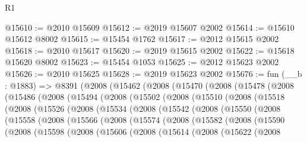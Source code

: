 \begin{lexlean}{R1}
\begin{coremodule}
@15610 := @2010 @15609
@15612 := @2019 @15607 @2002
@15614 := @15610 @15612 @8002
@15615 := @15454 @1762
@15617 := @2012 @15615 @2002
@15618 := @2010 @15617
@15620 := @2019 @15615 @2002
@15622 := @15618 @15620 @8002
@15623 := @15454 @1053
@15625 := @2012 @15623 @2002
@15626 := @2010 @15625
@15628 := @2019 @15623 @2002
@15676 := fun (__b : @1883) =>
  @8391
    (@2008
      (@15462
        (@2008
          (@15470
            (@2008
              (@15478
                (@2008
                  (@15486
                    (@2008
                      (@15494
                        (@2008
                          (@15502
                            (@2008
                              (@15510
                                (@2008
                                  (@15518
                                    (@2008
                                      (@15526
                                        (@2008
                                          (@15534
                                            (@2008
                                              (@15542
                                                (@2008
                                                  (@15550
                                                    (@2008
                                                      (@15558
                                                        (@2008
                                                          (@15566
                                                            (@2008
                                                              (@15574
                                                                (@2008
                                                                  (@15582
                                                                    (@2008
                                                                      (@15590
                                                                        (@2008
                                                                          (@15598
                                                                            (@2008
                                                                              (@15606
                                                                                (@2008
                                                                                  (@15614
                                                                                    (@2008
                                                                                      (@15622
                                                                                        (@2008

\end{coremodule}
\end{lexlean}
